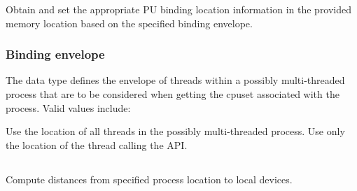 \descr

Obtain and set the appropriate \ac{PU} binding location information in the provided memory location based on the specified binding envelope.

\subsubsection{Binding envelope}
\label{api:proc:bindenv}

The  data type
defines the envelope of threads within a possibly multi-threaded process that are to be considered when getting the cpuset associated with the process. Valid values include:

\begin{constantdesc}
%
Use the location of all threads in the possibly multi-threaded process.
%
Use only the location of the thread calling the \ac{API}.
%
\end{constantdesc}


\subsection{}

\summary

Compute distances from specified process location to local devices.

\format


